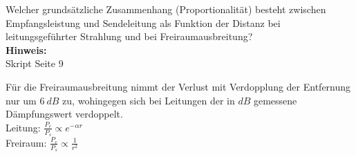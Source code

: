 \begin{question}[section=1,name={Leistungsvergleich Freiraum/Leitung},difficulty=,quantity=2,type=thr,tags={20131210,20130513}]
	Welcher grundsätzliche Zusammenhang (Proportionalität) besteht zwischen Empfangsleistung und Sendeleitung als Funktion der Distanz bei leitungsgeführter Strahlung und bei Freiraumausbreitung?
	\\ \textbf{Hinweis:}\\
	Skript Seite 9
\end{question}
\begin{solution}
	Für die Freiraumausbreitung nimmt der Verlust mit Verdopplung der Entfernung nur um $6~dB$ zu, wohingegen sich bei Leitungen der in $dB$ gemessene Dämpfungswert verdoppelt.\\
	Leitung:  $ \frac{P_e}{P_s} \propto   e^{-\alpha r} $\\
	Freiraum: $ \frac{P_e}{P_s} \propto  \frac{1}{r^2} $
\end{solution}